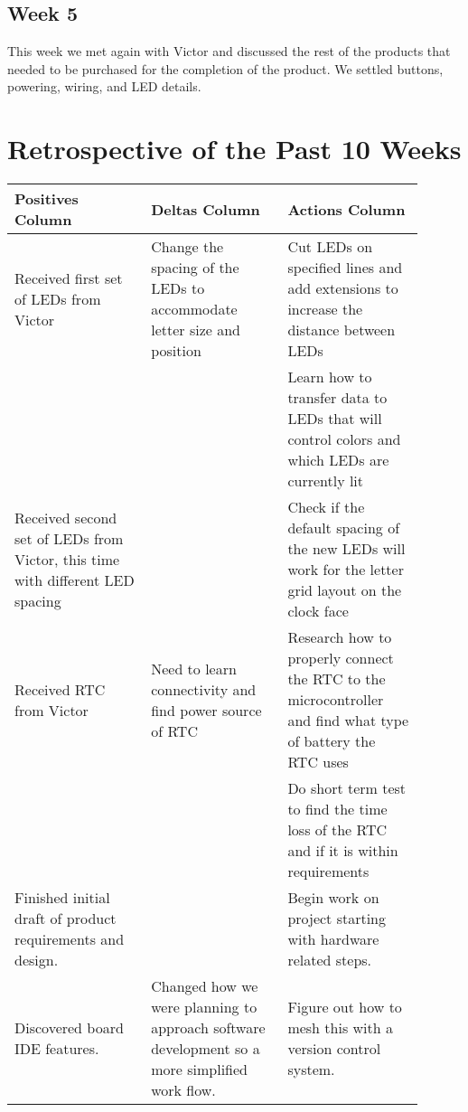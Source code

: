\documentclass[onecolumn, draftclsnofoot,10pt, compsoc]{IEEEtran}
\begin{document}
\subsection{Week 5}
This week we met again with Victor and discussed the rest of the products that needed to be purchased for the completion of the product.
We settled buttons, powering, wiring, and LED details.

\newpage
\section{Retrospective of the Past 10 Weeks}
\vspace{2mm}
\begin{center}
\begin{tabular}{| p{0.3\linewidth} | p{0.3\linewidth} | p{0.3\linewidth} |}
\hline
Positives Column &
Deltas Column &
Actions Column \\
\hline
Received first set of LEDs from Victor &
Change the spacing of the LEDs to accommodate letter size and position &
Cut LEDs on specified lines and add extensions to increase the distance between LEDs \\
\hline
 &
 &
Learn how to transfer data to LEDs that will control colors and which LEDs are currently lit \\
\hline
Received second set of LEDs from Victor, this time with different LED spacing &
 &
Check if the default spacing of the new LEDs will work for the letter grid layout on the clock face \\
\hline
Received RTC from Victor &
Need to learn connectivity and find power source of RTC &
Research how to properly connect the RTC to the microcontroller and find what type of battery the RTC uses \\
\hline
 &
 &
Do short term test to find the time loss of the RTC and if it is within requirements \\
\hline
Finished initial draft of product requirements and design. &
&
Begin work on project starting with hardware related steps. \\
\hline
Discovered board IDE features. &
Changed how we were planning to approach software development so a more simplified work flow. &
Figure out how to mesh this with a version control system. \\
\hline


\end{tabular}
\end{center}
\end{document}
